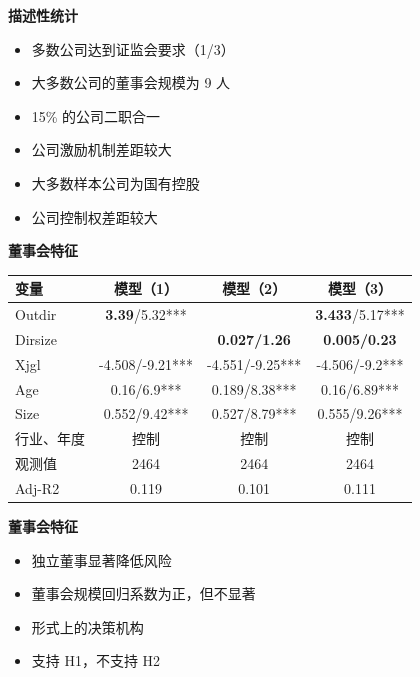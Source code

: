 \documentclass[aspectratio=169,UTF8,zihao=-4]{ctexbeamer}
\newcommand{\bigidea}[1]{
  \begin{center}
    \vspace{0.8em}
    {\LARGE \bfseries #1}
    \vspace{0.6em}
  \end{center}
}
\begin{document}
\begin{frame}
  \bigidea{描述性统计}
  \begin{itemize}
    \item \Large 多数公司达到证监会要求（1/3）
    \item \Large 大多数公司的董事会规模为 9 人
    \item \Large 15\% 的公司二职合一
    \item \Large 公司激励机制差距较大
    \item \Large 大多数样本公司为国有控股
    \item \Large 公司控制权差距较大
  \end{itemize}
\end{frame}

\begin{frame}
  \bigidea{董事会特征}
  \centering
  \large
  \begin{tabular}{lccc}
    \toprule
    变量 & 模型（1） & 模型（2） & 模型（3） \\
    \midrule
    Outdir & \textbf{3.39}/5.32*** &  & \textbf{3.433}/5.17*** \\
    Dirsize &  & \textbf{0.027/1.26} & \textbf{0.005/0.23} \\
    Xjgl & -4.508/-9.21*** & -4.551/-9.25*** & -4.506/-9.2*** \\
    Age & 0.16/6.9*** & 0.189/8.38*** & 0.16/6.89*** \\
    Size & 0.552/9.42*** & 0.527/8.79*** & 0.555/9.26*** \\
    行业、年度 & 控制 & 控制 & 控制 \\
    观测值 & 2464 & 2464 & 2464 \\
    Adj-R2 & 0.119 & 0.101 & 0.111 \\
    \bottomrule
  \end{tabular}
\end{frame}

\begin{frame}
  \bigidea{董事会特征}
  \begin{itemize}
    \item \Large 独立董事显著降低风险
    \item \Large 董事会规模回归系数为正，但不显著
    \item \Large 形式上的决策机构 
    \item \Large 支持 H1，不支持 H2
  \end{itemize}
\end{frame}
\end{document}
